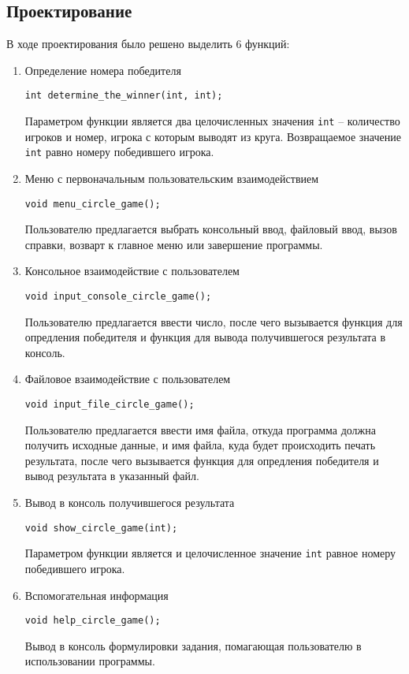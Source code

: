 \documentclass[12pt,a4paper]{report}
\begin{document}
\subsection{Проектирование}
\hspace{\parindent}В ходе проектирования было решено выделить 6 функций:
\begin{enumerate}
 	\item Определение номера победителя
 	
 	\verb+int determine_the_winner(int, int);+
 	
	Параметром функции является два целочисленных значения \verb+int+ -- количество игроков и номер, игрока с которым выводят из круга. Возвращаемое значение \verb+int+ равно номеру победившего игрока.	 
		 
		 
	\item Меню с первоначальным пользовательским взаимодействием
	
	\verb+void menu_circle_game();+
	
	Пользователю предлагается выбрать консольный ввод, файловый ввод, вызов справки, возварт к главное меню или завершение программы. 	 
		 
	\item Консольное взаимодействие с пользователем
	
	\verb+void input_console_circle_game();+

	Пользователю предлагается ввести число, после чего вызывается функция для опредления победителя и функция для вывода получившегося результата в консоль.
	
	\item Файловое взаимодействие с пользователем
	
	\verb+void input_file_circle_game();+

	Пользователю предлагается ввести имя файла, откуда программа должна получить исходные данные, и имя файла, куда будет происходить печать результата, после чего вызывается функция для опредления победителя и вывод результата в указанный файл.
	
	\item Вывод в консоль получившегося результата
	
	\verb+void show_circle_game(int);+

Параметром функции является и целочисленное значение \verb+int+ равное номеру победившего игрока.
	
	
	\item Вспомогательная информация
	
	\verb+void help_circle_game();+
	
	Вывод в консоль формулировки задания, помагающая пользователю в использовании программы.
\end{enumerate}
\end{document}
